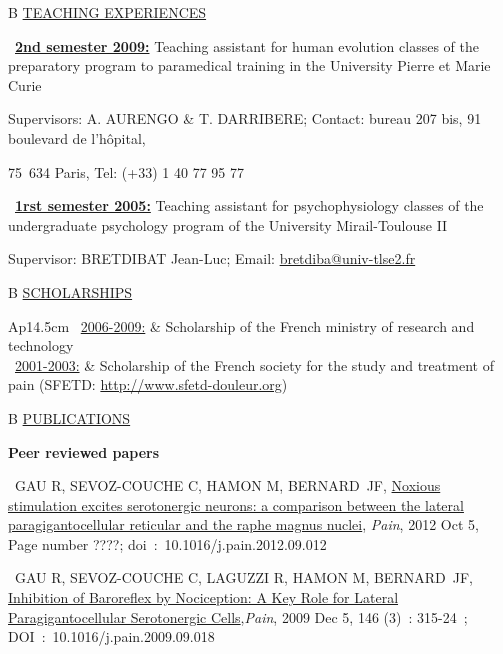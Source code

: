 \documentclass[a4paper,12pt,oneside]{letter}
\begin{document}
{\begin{tabular}{B}
\underline{TEACHING EXPERIENCES}
\end{tabular}

\textbullet~\underline{\textbf{2nd semester 2009:}} 	Teaching assistant for human evolution classes of the preparatory program to paramedical training in the University Pierre et Marie Curie

Supervisors: A. AURENGO \& T. DARRIBERE; Contact: bureau 207 bis, 91 boulevard de l’hôpital, 

75 634 Paris, Tel: (+33) 1 40 77 95 77

\textbullet~\underline{\textbf{1rst semester 2005:}} 	Teaching assistant for psychophysiology classes of the undergraduate psychology program of the University Mirail-Toulouse II

Supervisor: BRETDIBAT Jean-Luc; Email: \href{mailto:bretdiba@univ-tlse2.fr}{bretdiba@univ-tlse2.fr}

\begin{tabular}{B}
\underline{SCHOLARSHIPS}
\end{tabular}

\begin{tabular}{Ap{14.5cm}}
\textbullet~\underline{2006-2009:} & Scholarship of the French ministry of research and technology \\
\textbullet~\underline{2001-2003:} & Scholarship of the French society for the study and treatment of pain \newline
				     (SFETD: \url{http://www.sfetd-douleur.org})
\end{tabular}

\begin{tabular}{B}
\underline{PUBLICATIONS}
\end{tabular}

\begin{center}
\Large\textbf{Peer reviewed papers}
\end{center}

\textbullet~GAU R, SEVOZ-COUCHE C, HAMON M, BERNARD JF, 
\href{http://www.painjournalonline.com/article/S0304-3959\%2812\%2900540-4/abstract}{Noxious stimulation excites serotonergic neurons: a comparison between the lateral paragigantocellular reticular and the raphe magnus nuclei}, \textit{Pain}, 2012 Oct 5, Page number ????; doi : 10.1016/j.pain.2012.09.012

\textbullet~GAU R, SEVOZ-COUCHE C, LAGUZZI R, HAMON M, BERNARD JF, \href{http://www.painjournalonline.com/article/S0304-3959\%2809\%2900554-5/abstract}{Inhibition of Baroreflex by Nociception: A Key Role for Lateral Paragigantocellular Serotonergic Cells},\textit{Pain}, 2009 Dec 5, 146 (3) : 315-24 ; DOI : 10.1016/j.pain.2009.09.018

}
\end{document}

